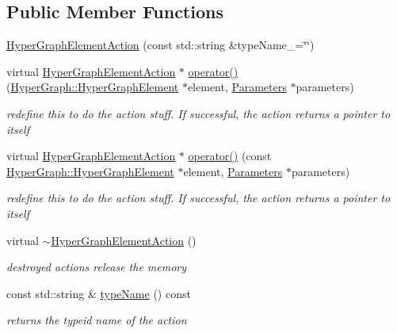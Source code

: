 \subsection*{Public Member Functions}
\begin{DoxyCompactItemize}
\item 
\hyperlink{classg2o_1_1HyperGraphElementAction_a1230bdd21f7c2b2c71e7206b59d81fd5}{Hyper\+Graph\+Element\+Action} (const std\+::string \&type\+Name\+\_\+=\char`\"{}\char`\"{})
\item 
virtual \hyperlink{classg2o_1_1HyperGraphElementAction}{Hyper\+Graph\+Element\+Action} $\ast$ \hyperlink{classg2o_1_1HyperGraphElementAction_a2faab4a1cdaf5fc010cb9c8627b7d361}{operator()} (\hyperlink{structg2o_1_1HyperGraph_1_1HyperGraphElement}{Hyper\+Graph\+::\+Hyper\+Graph\+Element} $\ast$element, \hyperlink{structg2o_1_1HyperGraphElementAction_1_1Parameters}{Parameters} $\ast$parameters)
\begin{DoxyCompactList}\small\item\em redefine this to do the action stuff. If successful, the action returns a pointer to itself \end{DoxyCompactList}\item 
virtual \hyperlink{classg2o_1_1HyperGraphElementAction}{Hyper\+Graph\+Element\+Action} $\ast$ \hyperlink{classg2o_1_1HyperGraphElementAction_a0dc2ff77e22791e32810d2c43b7154ad}{operator()} (const \hyperlink{structg2o_1_1HyperGraph_1_1HyperGraphElement}{Hyper\+Graph\+::\+Hyper\+Graph\+Element} $\ast$element, \hyperlink{structg2o_1_1HyperGraphElementAction_1_1Parameters}{Parameters} $\ast$parameters)
\begin{DoxyCompactList}\small\item\em redefine this to do the action stuff. If successful, the action returns a pointer to itself \end{DoxyCompactList}\item 
virtual \hyperlink{classg2o_1_1HyperGraphElementAction_a01f7f7f2fb00018f2d0163a611f2f5da}{$\sim$\+Hyper\+Graph\+Element\+Action} ()
\begin{DoxyCompactList}\small\item\em destroyed actions release the memory \end{DoxyCompactList}\item 
const std\+::string \& \hyperlink{classg2o_1_1HyperGraphElementAction_a0bc89d3bf6b1114dfb0e7df874b087d2}{type\+Name} () const 
\begin{DoxyCompactList}\small\item\em returns the typeid name of the action \end{DoxyCompactList}\item 

\end{DoxyCompactItemize}
